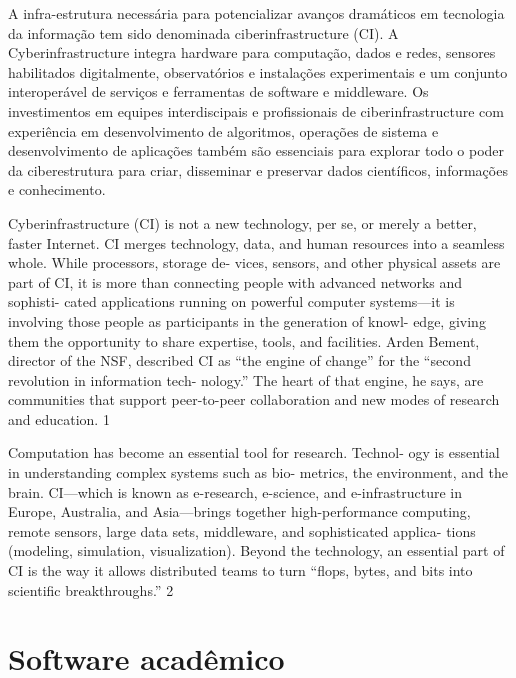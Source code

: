 A infra-estrutura necessária para potencializar avanços dramáticos
em tecnologia da informação tem sido denominada ciberinfrastructure (CI). A
Cyberinfrastructure integra hardware para computação, dados e redes, sensores
habilitados digitalmente, observatórios e instalações experimentais e um
conjunto interoperável de serviços e ferramentas de software e middleware. Os
investimentos em equipes interdiscipais e profissionais de ciberinfrastructure
com experiência em desenvolvimento de algoritmos, operações de sistema e
desenvolvimento de aplicações também são essenciais para explorar todo o poder
da ciberestrutura para criar, disseminar e preservar dados científicos,
informações e conhecimento.

\cite{council2007cyberinfrastructure}

Cyberinfrastructure (CI) is not a new technology, per se, or merely
a better, faster Internet. CI merges technology, data, and human
resources into a seamless whole. While processors, storage de-
vices, sensors, and other physical assets are part of CI, it is more
than connecting people with advanced networks and sophisti-
cated applications running on powerful computer systems—it is
involving those people as participants in the generation of knowl-
edge, giving them the opportunity to share expertise, tools, and
facilities. Arden Bement, director of the NSF, described CI as “the
engine of change” for the “second revolution in information tech-
nology.” The heart of that engine, he says, are communities that
support peer-to-peer collaboration and new modes of research
and education. 1

Computation has become an essential tool for research. Technol-
ogy is essential in understanding complex systems such as bio-
metrics, the environment, and the brain. CI—which is known as
e-research, e-science, and e-infrastructure in Europe, Australia,
and Asia—brings together high-performance computing, remote
sensors, large data sets, middleware, and sophisticated applica-
tions (modeling, simulation, visualization). Beyond the technology,
an essential part of CI is the way it allows distributed teams to turn
“flops, bytes, and bits into scientific breakthroughs.” 2

\section{Software acadêmico}

